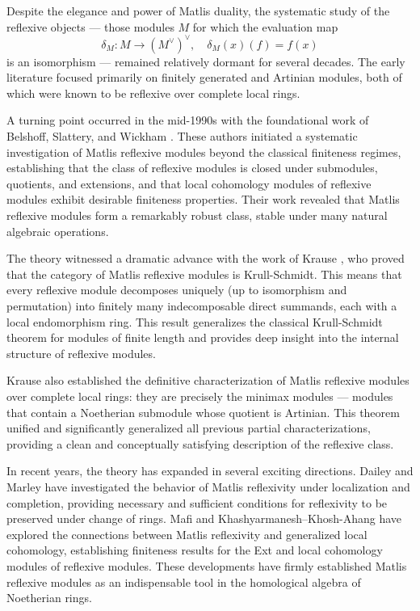 \documentclass{kms-c}
\theoremstyle{plain}
\theoremstyle{definition}
\theoremstyle{remark}
\begin{document}
Despite the elegance and power of Matlis duality, the systematic study of the reflexive objects --- those modules \( M \) for which the evaluation map 
\[
\delta_M : M \longrightarrow (M^\vee)^\vee, \quad \delta_M(x)(f) = f(x)
\]
is an isomorphism --- remained relatively dormant for several decades. The early literature focused primarily on finitely generated and Artinian modules, both of which were known to be reflexive over complete local rings.

A turning point occurred in the mid-1990s with the foundational work of Belshoff, Slattery, and Wickham \cite{Belshoff1996a, Belshoff1996b}. These authors initiated a systematic investigation of Matlis reflexive modules beyond the classical finiteness regimes, establishing that the class of reflexive modules is closed under submodules, quotients, and extensions, and that local cohomology modules of reflexive modules exhibit desirable finiteness properties. Their work revealed that Matlis reflexive modules form a remarkably robust class, stable under many natural algebraic operations.

The theory witnessed a dramatic advance with the work of Krause \cite{Krause2025}, who proved that the category of Matlis reflexive modules is Krull-Schmidt. This means that every reflexive module decomposes uniquely (up to isomorphism and permutation) into finitely many indecomposable direct summands, each with a local endomorphism ring. This result generalizes the classical Krull-Schmidt theorem for modules of finite length and provides deep insight into the internal structure of reflexive modules.

Krause also established the definitive characterization of Matlis reflexive modules over complete local rings: they are precisely the minimax modules --- modules that contain a Noetherian submodule whose quotient is Artinian. This theorem unified and significantly generalized all previous partial characterizations, providing a clean and conceptually satisfying description of the reflexive class.

In recent years, the theory has expanded in several exciting directions. Dailey and Marley \cite{Dailey2017} have investigated the behavior of Matlis reflexivity under localization and completion, providing necessary and sufficient conditions for reflexivity to be preserved under change of rings. Mafi \cite{Mafi2009} and Khashyarmanesh--Khosh-Ahang \cite{Khashyarmanesh2008} have explored the connections between Matlis reflexivity and generalized local cohomology, establishing finiteness results for the Ext and local cohomology modules of reflexive modules. These developments have firmly established Matlis reflexive modules as an indispensable tool in the homological algebra of Noetherian rings.
\end{document}
